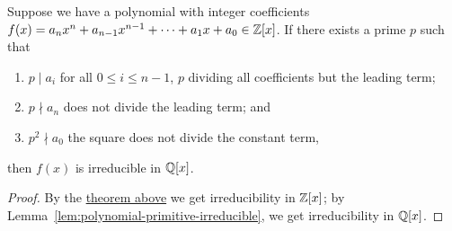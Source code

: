 \begin{corollary}\label{cor:eisenstein-criterion}
    Suppose we have a polynomial with integer coefficients
    \(f(x) = a_n x^n + a_{n-1}x^{n-1} + \cdots + a_1 x + a_0 \in \mathbb{Z}[x]\).
    If there exists a prime \(p\) such that
    \begin{enumerate}[label={(\alph*)}, itemsep=0mm]
        \item \(p \mid a_i\) for all \(0 \leq i \leq n-1\),
            \(p\) dividing all coefficients but the leading term;
        \item \(p \nmid a_n\) does not divide the leading term; and
        \item \(p^2 \nmid a_0\) the square does not divide the constant term,
    \end{enumerate}
    then \(f(x)\) is irreducible in \(\mathbb{Q}[x]\).
\end{corollary}
\begin{proof}
    By the \hyperref[thm:eisenstein-criterion]{theorem above}
    we get irreducibility in \(\mathbb{Z}[x]\);
    by Lemma~\ref{lem:polynomial-primitive-irreducible},
    we get irreducibility in \(\mathbb{Q}[x]\).
\end{proof}

